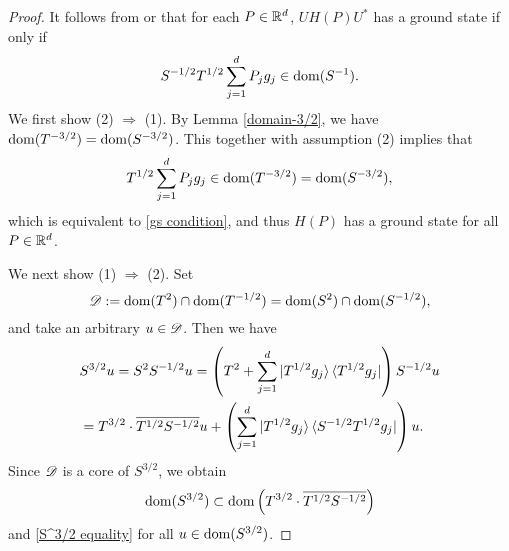 \documentclass[12pt]{article}
\theoremstyle{plain}
\numberwithin{equation}{section}
\theoremstyle{remark}
\begin{document}
\begin{proof}
It follows from \cite[Proposition 3.13]{De03} or \cite[Theorem 11.73 (3)]{DG13} that for each $P\in\mathbb{R}^d$, $UH(P)U^{*}$ has a ground state if only if 
\begin{equation}\label{gs condition}
S^{-1/2}T^{1/2}\sum_{j=1}^{d} P_jg_j\in\mathop{\mathrm{dom}}(S^{-1}).
\end{equation}
We first show (2) $\Rightarrow$ (1).
By Lemma \ref{domain-3/2}, we have $\mathop{\mathrm{dom}}(T^{-3/2})=\mathop{\mathrm{dom}}(S^{-3/2})$.
This together with assumption (2) implies that
\[
T^{1/2}\sum_{j=1}^{d} P_jg_j\in\mathop{\mathrm{dom}}(T^{-3/2})=\mathop{\mathrm{dom}}(S^{-3/2}),
\]
which is equivalent to \eqref{gs condition}, and thus $H(P)$ has a ground state for all $P\in\mathbb{R}^d$.

We next show (1) $\Rightarrow$ (2).
Set
\[
\mathscr{D} :=\mathop{\mathrm{dom}}(T^2)\cap\mathop{\mathrm{dom}}(T^{-1/2})=\mathop{\mathrm{dom}}(S^2)\cap\mathop{\mathrm{dom}}(S^{-1/2}),
\]
and take an arbitrary $u\in\mathscr{D} $.
Then we have
\begin{align}\label{S^3/2 equality}
&S^{3/2}u = S^2S^{-1/2}u = \left(T^2+\sum_{j=1}^d\ket{T^{1/2}g_j}\bra{T^{1/2}g_j}\right)S^{-1/2}u\notag\\
&= T^{3/2}\cdot\overline{T^{1/2}S^{-1/2}}u+\left(\sum_{j=1}^d\ket{T^{1/2}g_j}\bra{S^{-1/2}T^{1/2}g_j}\right)u.
\end{align}
Since $\mathscr{D} $ is a core of $S^{3/2}$, we obtain 
\[
\mathop{\mathrm{dom}}(S^{3/2})\subset\mathop{\mathrm{dom}}\left(T^{3/2}\cdot\overline{T^{1/2}S^{-1/2}}\right)
\]
and \eqref{S^3/2 equality} for all $u\in\mathop{\mathrm{dom}}(S^{3/2})$.


\end{proof}
\end{document}
